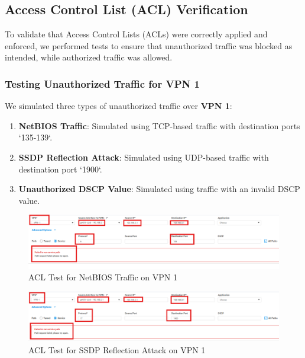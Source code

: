 \documentclass[12pt,english]{report}
\begin{document}
\subsection{Access Control List (ACL) Verification}

To validate that Access Control Lists (ACLs) were correctly applied and enforced, we performed tests to ensure that unauthorized traffic was blocked as intended, while authorized traffic was allowed.
\newpage
\subsubsection{Testing Unauthorized Traffic for VPN 1}

We simulated three types of unauthorized traffic over \textbf{VPN 1}:
\begin{enumerate}
    \item \textbf{NetBIOS Traffic}: Simulated using TCP-based traffic with destination ports `135-139`.
    \item \textbf{SSDP Reflection Attack}: Simulated using UDP-based traffic with destination port `1900`.
    \item \textbf{Unauthorized DSCP Value}: Simulated using traffic with an invalid DSCP value.
\end{enumerate}

\begin{figure}[H]
    \centering
    \includegraphics[width=1\textwidth]{chapter 4/jdid/VPN1_netbios.png}
    \caption{ACL Test for NetBIOS Traffic on VPN 1}
    \label{fig:acl_test_vpn1_netbios}
\end{figure}

\begin{figure}[H]
    \centering
    \includegraphics[width=1\textwidth]{chapter 4/jdid/vpn1_ssdp.png}
    \caption{ACL Test for SSDP Reflection Attack on VPN 1}
    \label{fig:acl_test_vpn1_ssdp}
\end{figure}
\end{document}
